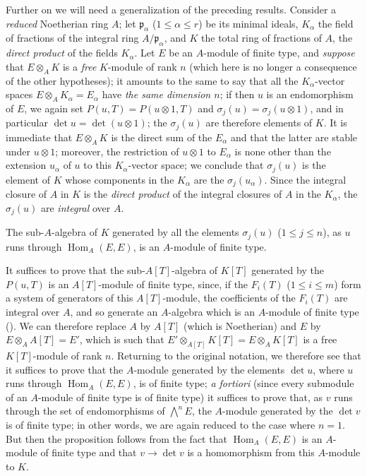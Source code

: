 \begin{remark}[6.4.7]
\label{II.6.4.7}
Further on we will need a generalization of the preceding results. Consider
a \emph{reduced} Noetherian ring $A$; let $\mathfrak{p}_\alpha$
($1\leq\alpha\leq r$) be its minimal ideals, $K_\alpha$ the field of
fractions of the integral ring $A/\mathfrak{p}_\alpha$, and $K$ the total
ring of fractions of $A$, the \emph{direct product} of the fields
$K_\alpha$. Let $E$ be an $A$-module of finite type, and \emph{suppose} that
$E\otimes_AK$ is a \emph{free} $K$-module of rank $n$ (which here is no longer a
consequence of the other hypotheses); it amounts to the same to say that all
the $K_\alpha$-vector spaces $E\otimes_AK_\alpha=E_\alpha$ have \emph{the
same dimension $n$}; if then $u$ is an endomorphism of $E$, we again set
$P(u,T)=P(u\otimes1,T)$ and $\sigma_j(u)=\sigma_j(u\otimes1)$, and in
particular $\det u=\det(u\otimes1)$; the $\sigma_j(u)$ are therefore
elements of $K$. It is immediate that $E\otimes_AK$ is the direct sum of the
$E_\alpha$ and that the latter are stable under $u\otimes1$; moreover, the
restriction of $u\otimes1$ to $E_\alpha$ is none other than the extension
$u_\alpha$ of $u$ to this $K_\alpha$-vector space; we conclude that
$\sigma_j(u)$ is the element of $K$ whose components in the $K_\alpha$ are
the $\sigma_j(u_\alpha)$. Since the integral closure of $A$ in $K$ is the
\emph{direct product} of the integral closures of $A$ in the $K_\alpha$, the
$\sigma_j(u)$ are \emph{integral} over $A$.

\begin{lemma}[6.4.7.1]
\label{II.6.4.7.1}
The sub-$A$-algebra of $K$ generated by all the elements $\sigma_j(u)$
($1\leq j\leq n$), as $u$ runs through $\operatorname{Hom}_A(E,E)$, is an
$A$-module of finite type.
\end{lemma}

It suffices to prove that the sub-$A[T]$-algebra of $K[T]$ generated by the
$P(u,T)$ is an $A[T]$-module of finite type, since, if the $F_i(T)$
($1\leq i\leq m$) form a system of generators of this $A[T]$-module, the
coefficients of the $F_i(T)$ are integral over $A$, and so generate an
$A$-algebra which is an $A$-module of finite type
(\cite[vol.~I, p.~255, Theorem~1]{I-13}). We can therefore
replace $A$ by $A[T]$ (which is Noetherian) and $E$ by
$E\otimes_AA[T]=E'$, which is such that
$E'\otimes_{A[T]}K[T]=E\otimes_AK[T]$ is a free $K[T]$-module of rank $n$.
Returning to the original notation, we therefore see that it suffices to
prove that the $A$-module generated by the elements $\det u$, where $u$ runs
through $\operatorname{Hom}_A(E,E)$, is of finite type; \emph{a fortiori}
(since every submodule of an $A$-module of finite type is of finite type) it
suffices to prove that, as $v$ runs through the set of endomorphisms of
$\bigwedge^nE$, the $A$-module generated by the $\det v$ is of finite type;
in other words, we are again reduced to the case where $n=1$. But then the
proposition follows from the fact that $\operatorname{Hom}_A(E,E)$ is an
$A$-module of finite type and that $v\to\det v$ is a homomorphism from
this $A$-module to $K$.


\end{remark}
